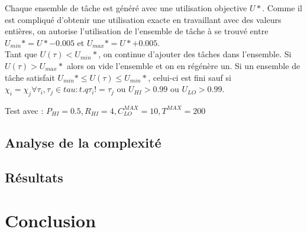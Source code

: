 \documentclass[11pt,a4paper,oneside]{book}
\theoremstyle{break}
\theoremstyle{breakplain}
\begin{document}
Chaque ensemble de tâche est généré avec une utilisation objective $U*$. Comme il est compliqué d'obtenir une utilisation exacte en travaillant avec des valeurs entières, on autorise l'utilisation de l'ensemble de tâche à se trouvé entre $U_{min}* = U*-0.005$ et $U_{max}* = U*+0.005$.\\
Tant que $U(\tau) < U_{min}*$, on continue d'ajouter des tâches dans l'ensemble. Si $U(\tau) > U_{max}*$ alors on vide l'ensemble et on en régénère un. Si un ensemble de tâche satisfait $U_{min}* \leq U(\tau) \leq  U_{min}*$, celui-ci est fini sauf si $\chi_i = \chi_j \forall \tau_i,\tau_j \in tau : t.q \tau_i != \tau_j$ ou $U_{HI} > 0.99$ ou $U_{LO} > 0.99$.

Test avec : $P_{HI} = 0.5, R_{HI} = 4, C^{MAX}_{LO} = 10, T^{MAX} = 200$

\section{Analyse de la complexité}

\section{Résultats}



\chapter{Conclusion}




%

\end{document}
